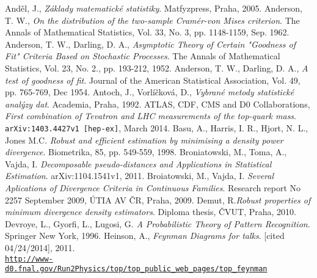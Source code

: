 \begin{thebibliography}{10}

%

Anděl, J., {\em Základy matematické statistiky}. Matfyzpress, Praha, 2005.
Anderson, T. W., {\em On the distribution of the two-sample Cram\'er-von Mises criterion}. The Annals of Mathematical Statistics, Vol. 33, No. 3, pp. 1148-1159, Sep. 1962.
Anderson, T. W., Darling, D. A., {\em Asymptotic Theory of Certain "Goodness of Fit" Criteria Based on Stochastic Processes}. The Annals of Mathematical Statistics, Vol. 23, No. 2., pp. 193-212, 1952.
Anderson, T. W., Darling, D. A., {\em A test of goodness of fit}. Journal of the American Statistical Association, Vol. 49, pp. 765-769, Dec 1954.
Antoch, J., Vorlíčková, D., {\em Vybrané metody statistické analýzy dat}. Academia, Praha, 1992.
ATLAS, CDF, CMS and D0 Collaborations, {\em First combination of Tevatron and LHC measurements of the top-quark mass}. \texttt{arXiv:1403.4427v1 [hep-ex]}, March 2014.
Basu, A., Harris, I. R., Hjort, N. L., Jones M.C. {\em Robust and efficient estimation by minimising a density power divergence}. Biometrika, 85, pp. 549-559, 1998.
Broniatowski, M., Toma, A., Vajda, I. {\em Decomposable pseudo-distances and Applications in Statistical Estimation}. arXiv:1104.1541v1, 2011.
Broiatowski, M., Vajda, I. {\em Several Aplications of Divergence Criteria in Continuous Families}. Research report No 2257 September 2009, ÚTIA AV ČR, Praha, 2009.
Demut, R.{\em Robust properties of minimum divergence density estimators}. Diploma thesis, ČVUT, Praha, 2010.
Devroye, L., Gyorfi, L., Lugosi, G. {\em A Probabilistic Theory of Pattern Recognition}. Springer New York, 1996.
Heinson, A., {\em Feynman Diagrams for talks}. [cited 04/24/2014], 2011. \\ \href{http://www-d0.fnal.gov/Run2Physics/top/top_public_web_pages/top_feynman_diagrams.html}{\texttt{http://www-d0.fnal.gov/Run2Physics/top/top\_public\_web\_pages/top\_feynman}} \\

\end{thebibliography}
